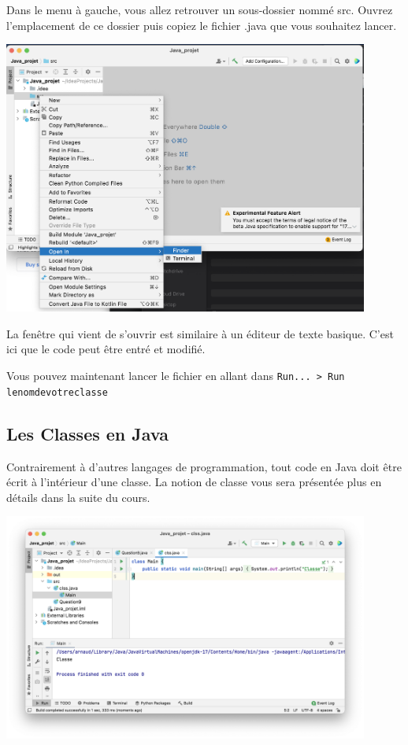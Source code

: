Dans le menu à gauche, vous allez retrouver un sous-dossier nommé src. Ouvrez l'emplacement de ce dossier puis copiez le fichier .java que vous souhaitez lancer.

\begin{center}
	\includegraphics[width=12cm]{6j}	
\end{center}

La fenêtre qui vient de s'ouvrir est similaire à un éditeur de texte basique. C'est ici que le code peut être entré et modifié.

Vous pouvez maintenant lancer le fichier en allant dans \lstinline{Run... > Run lenomdevotreclasse}

\subsection{Les Classes en Java}

Contrairement à d'autres langages de programmation, tout code en Java doit être écrit à l'intérieur d'une classe. La notion de classe vous sera présentée plus en détails dans la suite du cours.

\begin{center}
	\includegraphics[width=12cm]{7j}	
\end{center}

